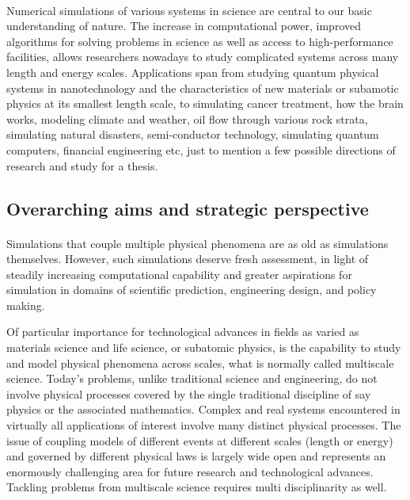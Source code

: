 \documentclass[%
twoside,                 %
final,                   %
10pt]{article}
\begin{document}
\paragraph{}


Numerical simulations of various systems in science are central to our
basic understanding of nature.  The increase in computational power,
improved algorithms for solving problems in science as well as access
to high-performance facilities, allows researchers nowadays to study
complicated systems across many length and energy scales. Applications
span from studying quantum physical systems in nanotechnology and the
characteristics of new materials or subamotic physics at its smallest
length scale, to simulating cancer treatment, how the brain works,
modeling climate and weather, oil flow through various rock strata,
simulating natural disasters, semi-conductor technology, simulating
quantum computers, financial engineering etc, just to mention a few
possible directions of research and study for a thesis.




\subsection*{Overarching aims and strategic perspective}

\paragraph{}

Simulations that couple multiple physical phenomena are
as old as simulations themselves. However, such
simulations deserve fresh assessment, in light of steadily
increasing computational capability and greater aspirations
for simulation in domains of scientific prediction, engineering
design, and policy making.

Of particular importance for technological advances in fields as varied as materials science and life science, or subatomic physics, is the capability to study and model physical phenomena across scales, what is normally called multiscale science.
Today's problems, unlike traditional science and engineering, do not  involve physical processes covered by the single traditional discipline of say physics or the associated mathematics. Complex and real systems encountered  in virtually all applications of interest involve many distinct physical processes. 
The issue of coupling models of different events at different scales (length or energy) and governed by different physical laws is largely wide open and represents an enormously challenging area for future research and technological advances.  Tackling problems from multiscale science requires multi disciplinarity as well.
\end{document}
